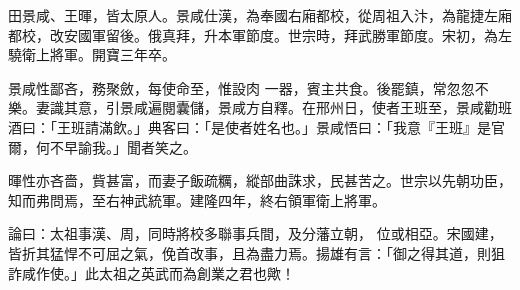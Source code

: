 \begin{pinyinscope}
 田景咸、王暉，皆太原人。景咸仕漢，為奉國右廂都校，從周祖入汴，為龍捷左廂都校，改安國軍留後。俄真拜，升本軍節度。世宗時，拜武勝軍節度。宋初，為左驍衛上將軍。開寶三年卒。



 景咸性鄙吝，務聚斂，每使命至，惟設肉
 一器，賓主共食。後罷鎮，常忽忽不樂。妻識其意，引景咸遍閱囊儲，景咸方自釋。在邢州日，使者王班至，景咸勸班酒曰：「王班請滿飲。」典客曰：「是使者姓名也。」景咸悟曰：「我意『王班』是官爾，何不早諭我。」聞者笑之。



 暉性亦吝嗇，貲甚富，而妻子飯疏糲，縱部曲誅求，民甚苦之。世宗以先朝功臣，知而弗問焉，至右神武統軍。建隆四年，終右領軍衛上將軍。



 論曰：太祖事漢、周，同時將校多聯事兵間，及分藩立朝，
 位或相亞。宋國建，皆折其猛悍不可屈之氣，俛首改事，且為盡力焉。揚雄有言：「御之得其道，則狙詐咸作使。」此太祖之英武而為創業之君也歟！



\end{pinyinscope}